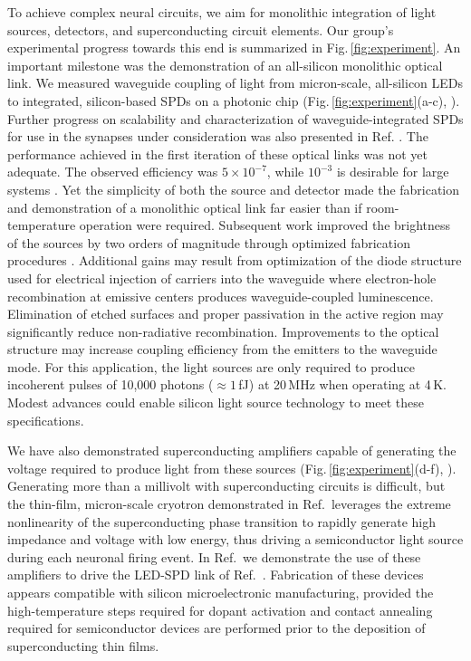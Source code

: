 \documentclass[twocolumn]{article}
\newcommand{\onlinecite}[1]{\hspace{-1 ex} \nocite{#1}\citenum{#1}}
\begin{document}
To achieve complex neural circuits, we aim for monolithic integration of light sources, detectors, and superconducting circuit elements. Our group's experimental progress towards this end is summarized in Fig.\,\ref{fig:experiment}. An important milestone was the demonstration of an all-silicon monolithic optical link. We measured waveguide coupling of light from micron-scale, all-silicon LEDs to integrated, silicon-based SPDs on a  photonic chip (Fig.\,\ref{fig:experiment}(a-c), \cite{buch2017}). Further progress on scalability and characterization of waveguide-integrated SPDs for use in the synapses under consideration was also presented in Ref. \onlinecite{buta2020_2}. The performance achieved in the first iteration of these optical links was not yet adequate. The observed efficiency was $5\times10^{-7}$, while $10^{-3}$ is desirable for large systems \cite{sh2019}. Yet the simplicity of both the source and detector made the fabrication and demonstration of a monolithic optical link far easier than if room-temperature operation were required. Subsequent work improved the brightness of the sources by two orders of magnitude through optimized fabrication procedures \cite{buta2020}. Additional gains may result from optimization of the diode structure used for electrical injection of carriers into the waveguide where electron-hole recombination at emissive centers produces waveguide-coupled luminescence. Elimination of etched surfaces and proper passivation in the active region may significantly reduce non-radiative recombination. Improvements to the optical structure may increase coupling efficiency from the emitters to the waveguide mode. For this application, the light sources are only required to produce incoherent pulses of 10,000 photons ($\approx 1$\,fJ) at 20\,MHz when operating at 4\,K. Modest advances could enable silicon light source technology to meet these specifications.

We have also demonstrated superconducting amplifiers capable of generating the voltage required to produce light from these sources (Fig.\,\ref{fig:experiment}(d-f), \cite{mcve2019}). Generating more than a millivolt with superconducting circuits is difficult, but the thin-film, micron-scale cryotron demonstrated in Ref.\,\onlinecite{mcve2019} leverages the extreme nonlinearity of the superconducting phase transition to rapidly generate high impedance and voltage with low energy, thus driving a semiconductor light source during each neuronal firing event. In Ref.\,\onlinecite{mcve2019} we demonstrate the use of these amplifiers to drive the LED-SPD link of Ref.\,\onlinecite{buch2017}. Fabrication of these devices appears compatible with silicon microelectronic manufacturing, provided the high-temperature steps required for dopant activation and contact annealing required for semiconductor devices are performed prior to the deposition of superconducting thin films.
\end{document}
